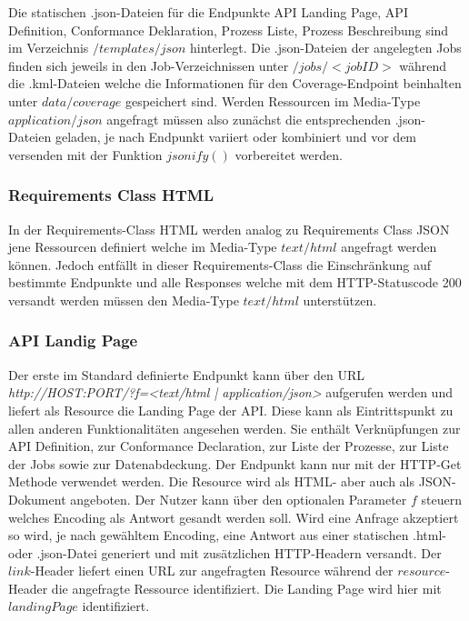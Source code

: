 Die statischen .json-Dateien für die Endpunkte API Landing Page, API Definition, Conformance Deklaration, Prozess Liste, Prozess Beschreibung sind im Verzeichnis
$/templates/json$ hinterlegt. Die .json-Dateien der angelegten Jobs finden sich jeweils in den Job-Verzeichnissen unter $/jobs/<jobID>$ während die .kml-Dateien
welche die Informationen für den Coverage-Endpoint beinhalten unter $data/coverage$ gespeichert sind. Werden Ressourcen im Media-Type $application/json$ angefragt
müssen also zunächst die entsprechenden .json-Dateien geladen, je nach Endpunkt variiert oder kombiniert und vor dem versenden mit der Funktion $jsonify()$
vorbereitet werden. 

\subsubsection{Requirements Class HTML}
In der Requirements-Class HTML werden analog zu Requirements Class JSON jene Ressourcen definiert welche im Media-Type $text/html$ angefragt werden können. Jedoch
entfällt in dieser Requirements-Class die Einschränkung auf bestimmte Endpunkte und alle Responses welche mit dem HTTP-Statuscode 200 versandt werden müssen den 
Media-Type $text/html$ unterstützen.

\subsubsection{API Landig Page}
Der erste im Standard definierte Endpunkt kann über den URL \textit{http://HOST:PORT/?f=<text/html | application/json>} aufgerufen werden und liefert als Resource die 
Landing Page der API. Diese kann als Eintrittspunkt zu allen anderen Funktionalitäten angesehen werden. Sie enthält Verknüpfungen zur API Definition, zur Conformance Declaration, 
zur Liste der Prozesse, zur Liste der Jobs sowie zur Datenabdeckung. Der Endpunkt kann nur mit der HTTP-Get Methode verwendet werden. Die Resource wird als HTML- aber auch als JSON-Dokument angeboten. 
Der Nutzer kann über den optionalen Parameter $f$ steuern welches Encoding als Antwort gesandt werden soll.
Wird eine Anfrage akzeptiert so wird, je nach gewähltem Encoding, eine Antwort aus einer statischen .html- oder .json-Datei generiert und mit zusätzlichen HTTP-Headern versandt.
Der $link$-Header liefert einen URL zur angefragten Resource während der $resource$-Header die angefragte Ressource identifiziert. 
Die Landing Page wird hier mit $landingPage$ identifiziert.

